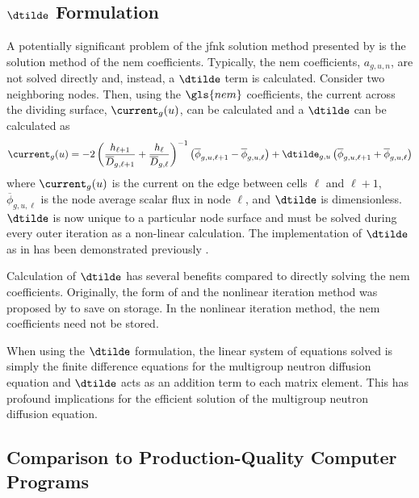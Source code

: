   \subsection{\texorpdfstring{$\dtilde$ Formulation}{D~ Formulation}}
    \label{sec:dtilde_formulation}
    A potentially significant problem of the \gls{jfnk} solution method 
    presented by \citeauthor{qe2paper} is the solution method of the \gls{nem}
    coefficients. Typically, the \gls{nem} coefficients, $a_{g,u,n}$, are not
    solved directly and, instead, a $\dtilde$ term is calculated. Consider two
    neighboring nodes. Then, using the $\gls{nem}$ coefficients, the current
    across the dividing surface, $\current_g(u)$, can be calculated and a
    $\dtilde$ can be calculated as
    \begin{equation}
      \label{eq:dtilde}
      \current_g(u) = 
        -2 \left( \frac{h_{\ell+1}}{\overline{D}_{g,\ell+1}} + 
          \frac{h_{\ell}}{\overline{D}_{g,\ell}} \right)^{-1}
          \left( \overline{\phi}_{g,u,\ell+1} -
          \overline{\phi}_{g,u,\ell} \right) + 
        \dtilde_{g,u} \left( \overline{\phi}_{g,u,\ell+1} +
          \overline{\phi}_{g,u,\ell} \right)
    \end{equation}
    where $\current_g(u)$ is the current on the edge between cells $\ell$ and
    $\ell+1$, $\overline{\phi}_{g,u,\ell}$ is the node average scalar flux in
    node $\ell$, and $\dtilde$ is dimensionless. $\dtilde$ is now unique to a
    particular node surface and must be solved during every outer iteration as a
    non-linear calculation. The implementation of $\dtilde$ as in
     has been demonstrated previously \cite{palmtagThesis}.

    Calculation of $\dtilde$ has several benefits compared to directly solving
    the \gls{nem} coefficients. Originally, the form of  and the
    nonlinear iteration method was proposed by \citeauthor{smith_nonlinear} to
    save on storage. In the nonlinear iteration method, the \gls{nem}
    coefficients need not be stored.

    When using the $\dtilde$ formulation, the linear system of equations solved
    is simply the finite difference equations for the multigroup neutron
    diffusion equation and $\dtilde$ acts as an addition term to each matrix
    element. This has profound implications for the efficient solution of the
    multigroup neutron diffusion equation.



  \subsection{Comparison to Production-Quality Computer Programs}

